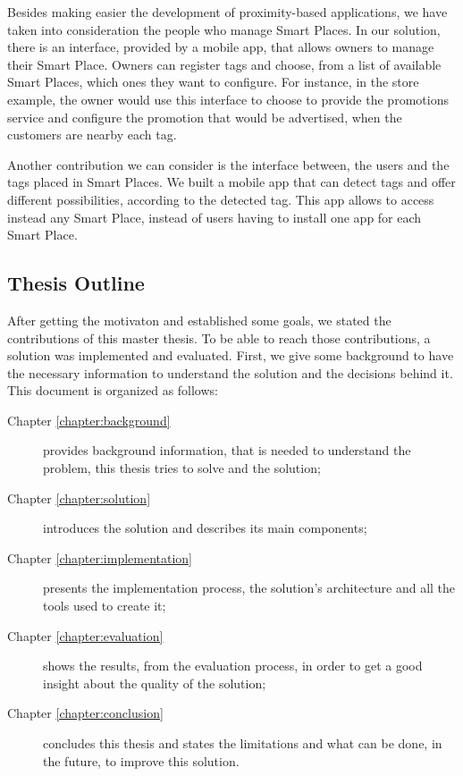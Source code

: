 Besides making easier the development of proximity-based applications, we have taken into consideration the people who manage Smart Places.
In our solution, there is an interface, provided by a mobile app, that allows owners to manage their Smart Place. Owners can register tags and choose, from a list of available Smart Places, which ones they want to configure.
For instance, in the store example, the owner would use this interface to choose to provide the promotions service and configure the promotion that would be advertised, when the customers are nearby each tag.

Another contribution we can consider is the interface between, the users and the tags placed in Smart Places.
We built a mobile app that can detect tags and offer different possibilities, according to the detected tag.
This app allows to access instead any Smart Place, instead of users having to install one app for each Smart Place.

\subsection{Thesis Outline}
\label{sec:introduction_thesis_outline}
After getting the motivaton and established some goals, we stated the contributions of this master thesis.
To be able to reach those contributions, a solution was implemented and evaluated.
First, we give some background to have the necessary information to understand the solution and the decisions behind it.
This document is organized as follows:
\begin{description}
  \item[Chapter \ref{chapter:background}]
  provides background information, that is needed to understand the problem, this thesis tries to solve and the solution;
  \item[Chapter \ref{chapter:solution}]
  introduces the solution and describes its main components;
  \item[Chapter \ref{chapter:implementation}]
  presents the implementation process, the solution's architecture and all the tools used to create it;
  \item[Chapter \ref{chapter:evaluation}]
  shows the results, from the evaluation process, in order to get a good insight about the quality of the solution;
  \item[Chapter \ref{chapter:conclusion}]
  concludes this thesis and states the limitations and what can be done, in the future, to improve this solution.
\end{description}
